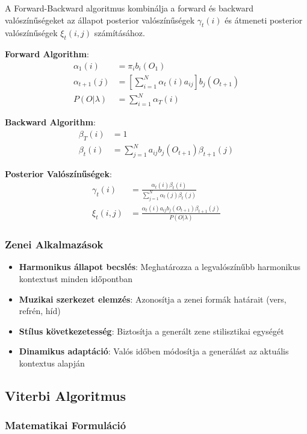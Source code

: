A Forward-Backward algoritmus kombinálja a forward és backward valószínűségeket az állapot posterior valószínűségek $\gamma_t(i)$ és átmeneti posterior valószínűségek $\xi_t(i,j)$ számításához.

\textbf{Forward Algorithm}:
\begin{align}
\alpha_1(i) &= \pi_i b_i(O_1) \\
\alpha_{t+1}(j) &= \left[\sum_{i=1}^{N} \alpha_t(i) a_{ij}\right] b_j(O_{t+1}) \\
P(O|\lambda) &= \sum_{i=1}^{N} \alpha_T(i)
\end{align}

\textbf{Backward Algorithm}:
\begin{align}
\beta_T(i) &= 1 \\
\beta_t(i) &= \sum_{j=1}^{N} a_{ij} b_j(O_{t+1}) \beta_{t+1}(j)
\end{align}

\textbf{Posterior Valószínűségek}:
\begin{align}
\gamma_t(i) &= \frac{\alpha_t(i) \beta_t(i)}{\sum_{j=1}^{N} \alpha_t(j) \beta_t(j)} \\
\xi_t(i,j) &= \frac{\alpha_t(i) a_{ij} b_j(O_{t+1}) \beta_{t+1}(j)}{P(O|\lambda)}
\end{align}

\subsubsection{Zenei Alkalmazások}

\begin{itemize}
    \item \textbf{Harmonikus állapot becslés}: Meghatározza a legvalószínűbb harmonikus kontextust minden időpontban
    \item \textbf{Muzikai szerkezet elemzés}: Azonosítja a zenei formák határait (vers, refrén, híd)
    \item \textbf{Stílus következetesség}: Biztosítja a generált zene stilisztikai egységét
    \item \textbf{Dinamikus adaptáció}: Valós időben módosítja a generálást az aktuális kontextus alapján
\end{itemize}

\subsection{Viterbi Algoritmus}

\subsubsection{Matematikai Formuláció}

